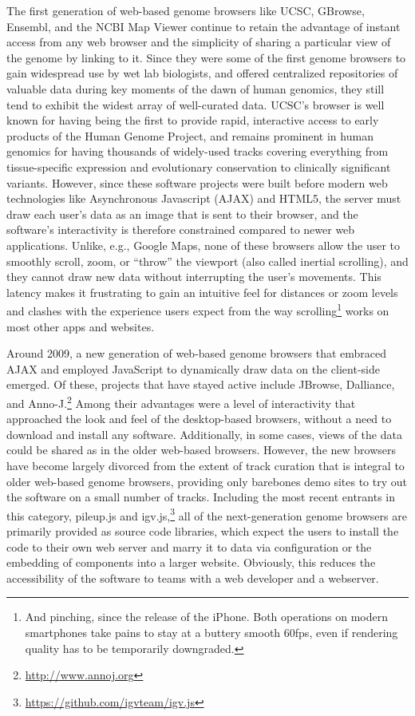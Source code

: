 The first generation of web-based genome browsers like UCSC,\autocite{Dreszer2011} GBrowse,\autocite{Stein2002} Ensembl,\autocite{Stalker2004} and the NCBI Map Viewer\autocite{Wheeler2003} continue to retain the advantage of instant access from any web browser and the simplicity of sharing a particular view of the genome by linking to it. Since they were some of the first genome browsers to gain widespread use by wet lab biologists, and offered centralized repositories of valuable data during key moments of the dawn of human genomics, they still tend to exhibit the widest array of well-curated data. UCSC's browser is well known for having being the first to provide rapid, interactive access to early products of the Human Genome Project,\autocite{Kent2002} and remains prominent in human genomics for having thousands of widely-used tracks covering everything from tissue-specific expression and evolutionary conservation to clinically significant variants. However, since these software projects were built before modern web technologies like Asynchronous Javascript (AJAX) and HTML5, the server must draw each user's data as an image that is sent to their browser, and the software's interactivity is therefore constrained compared to newer web applications. Unlike, e.g., Google Maps, none of these browsers allow the user to smoothly scroll, zoom, or ``throw'' the viewport (also called inertial scrolling), and they cannot draw new data without interrupting the user's movements. This latency makes it frustrating to gain an intuitive feel for distances or zoom levels and clashes with the experience users expect from the way scrolling\footnote{And pinching, since the release of the iPhone. Both operations on modern smartphones take pains to stay at a buttery smooth 60fps, even if rendering quality has to be temporarily downgraded.} works on most other apps and websites.

Around 2009, a new generation of web-based genome browsers that embraced AJAX\autocite{Paulson2005} and employed JavaScript to dynamically draw data on the client-side emerged. Of these, projects that have stayed active include JBrowse,\autocite{Buels2016} Dalliance,\autocite{Down2011} and Anno-J.\footnote{\url{http://www.annoj.org}} Among their advantages were a level of interactivity that approached the look and feel of the desktop-based browsers, without a need to download and install any software. Additionally, in some cases, views of the data could be shared as in the older web-based browsers. However, the new browsers have become largely divorced from the extent of track curation that is integral to older web-based genome browsers, providing only barebones demo sites to try out the software on a small number of tracks. Including the most recent entrants in this category, pileup.js\autocite{Vanderkam2016} and igv.js,\footnote{\url{https://github.com/igvteam/igv.js}} all of the next-generation genome browsers are primarily provided as source code libraries, which expect the users to install the code to their own web server and marry it to data via configuration or the embedding of components into a larger website. Obviously, this reduces the accessibility of the software to teams with a web developer and a webserver.

